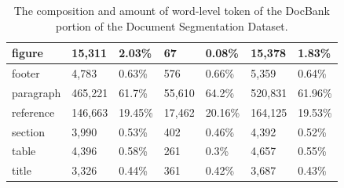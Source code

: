 \begin{table}[!ht]
\begin{tabular}{l|llllll|}
\multicolumn{1}{|l|}{figure}         & \multicolumn{1}{l|}{\cellcolor[HTML]{DAE8FC}15,311}         & \multicolumn{1}{l|}{\cellcolor[HTML]{EFEFEF}2.03\%}    & \multicolumn{1}{l|}{\cellcolor[HTML]{DAE8FC}67}            & \multicolumn{1}{l|}{\cellcolor[HTML]{EFEFEF}0.08\%}    & \multicolumn{1}{l|}{\cellcolor[HTML]{DAE8FC}15,378}         & \cellcolor[HTML]{EFEFEF}1.83\%    \\ \hline
\multicolumn{1}{|l|}{footer}         & \multicolumn{1}{l|}{\cellcolor[HTML]{DAE8FC}4,783}          & \multicolumn{1}{l|}{\cellcolor[HTML]{EFEFEF}0.63\%}    & \multicolumn{1}{l|}{\cellcolor[HTML]{DAE8FC}576}           & \multicolumn{1}{l|}{\cellcolor[HTML]{EFEFEF}0.66\%}    & \multicolumn{1}{l|}{\cellcolor[HTML]{DAE8FC}5,359}          & \cellcolor[HTML]{EFEFEF}0.64\%    \\ \hline
\multicolumn{1}{|l|}{paragraph}      & \multicolumn{1}{l|}{\cellcolor[HTML]{DAE8FC}465,221}        & \multicolumn{1}{l|}{\cellcolor[HTML]{EFEFEF}61.7\%}    & \multicolumn{1}{l|}{\cellcolor[HTML]{DAE8FC}55,610}        & \multicolumn{1}{l|}{\cellcolor[HTML]{EFEFEF}64.2\%}    & \multicolumn{1}{l|}{\cellcolor[HTML]{DAE8FC}520,831}        & \cellcolor[HTML]{EFEFEF}61.96\%   \\ \hline
\multicolumn{1}{|l|}{reference}      & \multicolumn{1}{l|}{\cellcolor[HTML]{DAE8FC}146,663}        & \multicolumn{1}{l|}{\cellcolor[HTML]{EFEFEF}19.45\%}   & \multicolumn{1}{l|}{\cellcolor[HTML]{DAE8FC}17,462}        & \multicolumn{1}{l|}{\cellcolor[HTML]{EFEFEF}20.16\%}   & \multicolumn{1}{l|}{\cellcolor[HTML]{DAE8FC}164,125}        & \cellcolor[HTML]{EFEFEF}19.53\%   \\ \hline
\multicolumn{1}{|l|}{section}        & \multicolumn{1}{l|}{\cellcolor[HTML]{DAE8FC}3,990}          & \multicolumn{1}{l|}{\cellcolor[HTML]{EFEFEF}0.53\%}    & \multicolumn{1}{l|}{\cellcolor[HTML]{DAE8FC}402}           & \multicolumn{1}{l|}{\cellcolor[HTML]{EFEFEF}0.46\%}    & \multicolumn{1}{l|}{\cellcolor[HTML]{DAE8FC}4,392}          & \cellcolor[HTML]{EFEFEF}0.52\%    \\ \hline
\multicolumn{1}{|l|}{table}          & \multicolumn{1}{l|}{\cellcolor[HTML]{DAE8FC}4,396}          & \multicolumn{1}{l|}{\cellcolor[HTML]{EFEFEF}0.58\%}    & \multicolumn{1}{l|}{\cellcolor[HTML]{DAE8FC}261}           & \multicolumn{1}{l|}{\cellcolor[HTML]{EFEFEF}0.3\%}     & \multicolumn{1}{l|}{\cellcolor[HTML]{DAE8FC}4,657}          & \cellcolor[HTML]{EFEFEF}0.55\%    \\ \hline
\multicolumn{1}{|l|}{title}          & \multicolumn{1}{l|}{\cellcolor[HTML]{DAE8FC}3,326}          & \multicolumn{1}{l|}{\cellcolor[HTML]{EFEFEF}0.44\%}    & \multicolumn{1}{l|}{\cellcolor[HTML]{DAE8FC}361}           & \multicolumn{1}{l|}{\cellcolor[HTML]{EFEFEF}0.42\%}    & \multicolumn{1}{l|}{\cellcolor[HTML]{DAE8FC}3,687}          & \cellcolor[HTML]{EFEFEF}0.43\%    \\ \hline
\end{tabular}
\caption{The composition and amount of word-level token of the DocBank portion of the Document Segmentation Dataset.}
\label{tab:dataset_docseg_docbank}
\end{table}


